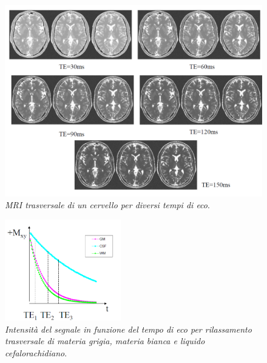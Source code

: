 \documentclass{report}
\numberwithin{equation}{section}
\numberwithin{figure}{section}
\begin{document}
\begin{figure}[htp]
\centering
\includegraphics[scale=0.5]{immagini/tec.png}
\caption{\label{fig:tec} \textit{MRI trasversale di un cervello per diversi tempi di eco}.}
\end{figure}

\begin{figure}
    \centering
    \includegraphics[width=0.45\textwidth]{immagini/te.png}
    \caption{\textit{Intensità del segnale in funzione del tempo di eco per rilassamento trasversale di materia grigia, materia bianca e liquido cefalorachidiano}.}
    \label{fig:te}
\end{figure}
\end{document}
